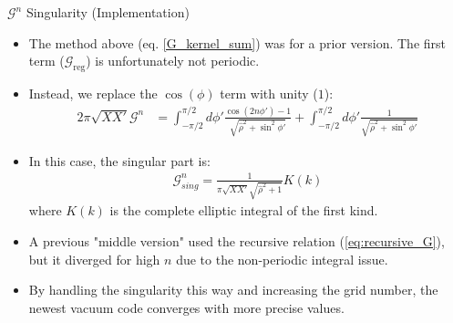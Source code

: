 \documentclass[8pt]{beamer}
\begin{document}
\begin{frame}{\color{white} $\mathcal{G}^n$ Singularity (Implementation)}
\begin{itemize}
    \item The method above (eq. \ref{G_kernel_sum}) was for a prior version. The first term ($\mathcal{G}_{\text{reg}}$) is unfortunately not periodic.
    \item Instead, we replace the $\cos(\phi)$ term with unity ($1$):
    \begin{align}
         2\pi\sqrt{XX'}\mathcal{G}^n &= \int_{-\pi/2}^{\pi/2} d\phi' \frac{\cos(2n\phi') - 1}{\sqrt{\hat{\rho}^2 + \sin^2\phi'}} + \int_{-\pi/2}^{\pi/2} d\phi' \frac{1}{\sqrt{\hat{\rho}^2 + \sin^2\phi'}}
    \end{align}
    \item In this case, the singular part is:
    \begin{align}
         \mathcal{G}^n_{sing} = \frac{1}{\pi\sqrt{XX'}\sqrt{\hat{\rho}^2 + 1}} K(k)
    \end{align}
    where $K(k)$ is the complete elliptic integral of the first kind.
    \item A previous "middle version" used the recursive relation (\ref{eq:recursive_G}), but it diverged for high $n$ due to the non-periodic integral issue.
    \item By handling the singularity this way and increasing the grid number, the newest vacuum code converges with more precise values.
\end{itemize}
\end{frame}
\end{document}
